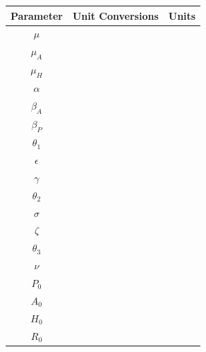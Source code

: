 \documentclass[12pt]{article}
\begin{document}
\begin{center}

\begin{tabular}{|c | c | c|}

 \hline

{Parameter} & {Unit Conversions} & {Units} \\ [0.5ex]

 \hline\hline
 
 $\mu$ &  &  \\

 \hline
 
 $\mu_A$ &  &  \\

 \hline
 
 $\mu_H$ &  &  \\

 \hline

$\alpha$ &  &  \\

 \hline

$\beta_A$ &  &  \\

\hline

$\beta_P$ &  &  \\

\hline

$\theta_1$&  &  \\

\hline

$\epsilon$ &  &  \\

\hline

$\gamma$ &  &  \\

\hline

$\theta_2$ &  &  \\

\hline

$\sigma$ &  &  \\

\hline

$\zeta$ &  &  \\

\hline

$\theta_3$ &  &  \\

\hline

$\nu$ &  &  \\

\hline

$P_0$ &  &  \\

\hline

$A_0$ &  &  \\

\hline

$H_0$ &  &  \\

\hline

$R_0$ &  &  \\


 \hline

\end{tabular}

\end{center}
 






\pagebreak



 
\end{document}
